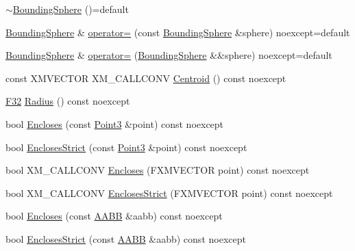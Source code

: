 \begin{DoxyCompactItemize}
\mbox{\hyperlink{classmage_1_1_bounding_sphere_af8c185ef441e95fd1f833e22fdee2bb3}{$\sim$\+Bounding\+Sphere}} ()=default
\item 
\mbox{\hyperlink{classmage_1_1_bounding_sphere}{Bounding\+Sphere}} \& \mbox{\hyperlink{classmage_1_1_bounding_sphere_ad8159156e4258d23afdb43e4a9104743}{operator=}} (const \mbox{\hyperlink{classmage_1_1_bounding_sphere}{Bounding\+Sphere}} \&sphere) noexcept=default
\item 
\mbox{\hyperlink{classmage_1_1_bounding_sphere}{Bounding\+Sphere}} \& \mbox{\hyperlink{classmage_1_1_bounding_sphere_a2a0e22660b37c54bb0e2e76efc198281}{operator=}} (\mbox{\hyperlink{classmage_1_1_bounding_sphere}{Bounding\+Sphere}} \&\&sphere) noexcept=default
\item 
const X\+M\+V\+E\+C\+T\+OR X\+M\+\_\+\+C\+A\+L\+L\+C\+O\+NV \mbox{\hyperlink{classmage_1_1_bounding_sphere_ae31660bd7333227d3f5e75b3243b8263}{Centroid}} () const noexcept
\item 
\mbox{\hyperlink{namespacemage_aa97e833b45f06d60a0a9c4fc22ae02c0}{F32}} \mbox{\hyperlink{classmage_1_1_bounding_sphere_a51c7e6db89c68d192961bfaf2114fb2f}{Radius}} () const noexcept
\item 
bool \mbox{\hyperlink{classmage_1_1_bounding_sphere_a7a6e27ec28a95caaef46f633b21af54e}{Encloses}} (const \mbox{\hyperlink{structmage_1_1_point3}{Point3}} \&point) const noexcept
\item 
bool \mbox{\hyperlink{classmage_1_1_bounding_sphere_a749a8fa3317e5490c12b049e68f7d502}{Encloses\+Strict}} (const \mbox{\hyperlink{structmage_1_1_point3}{Point3}} \&point) const noexcept
\item 
bool X\+M\+\_\+\+C\+A\+L\+L\+C\+O\+NV \mbox{\hyperlink{classmage_1_1_bounding_sphere_a5174af3edc1f3a5635df5395b54ae352}{Encloses}} (F\+X\+M\+V\+E\+C\+T\+OR point) const noexcept
\item 
bool X\+M\+\_\+\+C\+A\+L\+L\+C\+O\+NV \mbox{\hyperlink{classmage_1_1_bounding_sphere_ad75f41a261dd2e366457543b6150718a}{Encloses\+Strict}} (F\+X\+M\+V\+E\+C\+T\+OR point) const noexcept
\item 
bool \mbox{\hyperlink{classmage_1_1_bounding_sphere_a35feaaaf141319bdf37fca4da0ed0fc0}{Encloses}} (const \mbox{\hyperlink{classmage_1_1_a_a_b_b}{A\+A\+BB}} \&aabb) const noexcept
\item 
bool \mbox{\hyperlink{classmage_1_1_bounding_sphere_ac1598f0dcef439855f203fbd6357e6f7}{Encloses\+Strict}} (const \mbox{\hyperlink{classmage_1_1_a_a_b_b}{A\+A\+BB}} \&aabb) const noexcept
\item 

\end{DoxyCompactItemize}
